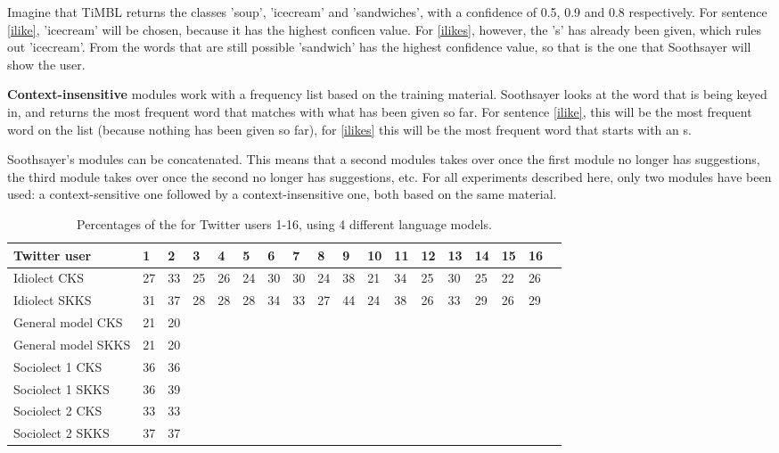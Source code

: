 \documentclass[11pt]{article}
\begin{document}
Imagine that TiMBL returns the classes 'soup', 'icecream' and 'sandwiches', with a confidence of 0.5, 0.9 and 0.8 respectively. For sentence \ref{ilike}, 'icecream' will be chosen, because it has the highest conficen value. For \ref{ilikes}, however, the 's' has already been given, which rules out 'icecream'. From the words that are still possible 'sandwich' has the highest confidence value, so that is the one that Soothsayer will show the user.

\textbf{Context-insensitive} modules work with a frequency list based on the training material. Soothsayer looks at the word that is being keyed in, and returns the most frequent word that matches with what has been given so far. For sentence \ref{ilike}, this will be the most frequent word on the list (because nothing has been given so far), for \ref{ilikes} this will be the most frequent word that starts with an s.

Soothsayer's modules can be concatenated. This means that a second modules takes over once the first module no longer has suggestions, the third module takes over once the second no longer has suggestions, etc. For all experiments described here, only two modules have been used: a context-sensitive one followed by a context-insensitive one, both based on the same material.

\begin{table*}[t]
\begin{tabular}{l|*{17}{l}}
Twitter user&1&2&3&4&5&6&7&8&9&10&11&12&13&14&15&16\\
\hline
Idiolect CKS&27&33&25&26&24&30&30&24&38&21&34&25&30&25&22&26\\
Idiolect SKKS&31&37&28&28&28&34&33&27&44&24&38&26&33&29&26&29\\
\hline
General model CKS&21&20\\
General model SKKS&21&20\\
\hline
Sociolect 1 CKS&36&36\\
Sociolect 1 SKKS&36&39\\
\hline
Sociolect 2 CKS&33&33\\
Sociolect 2 SKKS&37&37\\
\end{tabular}
\caption{Percentages of the for Twitter users 1-16, using 4 different language models.}
\label{result1}
\end{table*}
\end{document}
